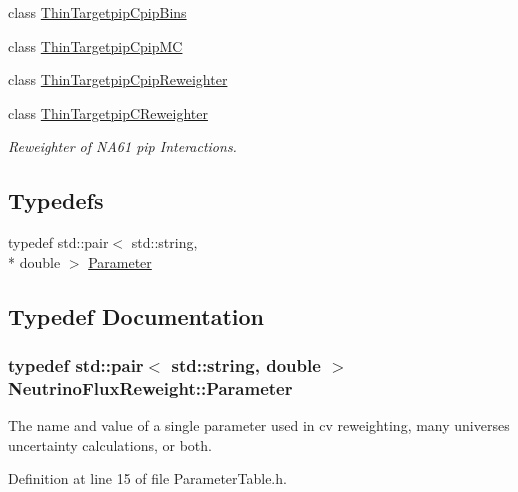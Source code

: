 \begin{DoxyCompactItemize}
class \hyperlink{class_neutrino_flux_reweight_1_1_thin_targetpip_cpip_bins}{Thin\-Targetpip\-Cpip\-Bins}
\item 
class \hyperlink{class_neutrino_flux_reweight_1_1_thin_targetpip_cpip_m_c}{Thin\-Targetpip\-Cpip\-M\-C}
\item 
class \hyperlink{class_neutrino_flux_reweight_1_1_thin_targetpip_cpip_reweighter}{Thin\-Targetpip\-Cpip\-Reweighter}
\item 
class \hyperlink{class_neutrino_flux_reweight_1_1_thin_targetpip_c_reweighter}{Thin\-Targetpip\-C\-Reweighter}
\begin{DoxyCompactList}\small\item\em Reweighter of N\-A61 pip Interactions. \end{DoxyCompactList}\end{DoxyCompactItemize}
\subsection*{Typedefs}
\begin{DoxyCompactItemize}
\item 
typedef std\-::pair$<$ std\-::string, \\*
double $>$ \hyperlink{namespace_neutrino_flux_reweight_aa1e1a244ea4addfb793b4e316e6c0a72}{Parameter}
\end{DoxyCompactItemize}


\subsection{Typedef Documentation}
\hypertarget{namespace_neutrino_flux_reweight_aa1e1a244ea4addfb793b4e316e6c0a72}{
\subsubsection[{Parameter}]{\setlength{\rightskip}{0pt plus 5cm}typedef std\-::pair$<$ std\-::string, double $>$ {\bf Neutrino\-Flux\-Reweight\-::\-Parameter}}}\label{namespace_neutrino_flux_reweight_aa1e1a244ea4addfb793b4e316e6c0a72}
The name and value of a single parameter used in cv reweighting, many universes uncertainty calculations, or both. 

Definition at line 15 of file Parameter\-Table.\-h.


